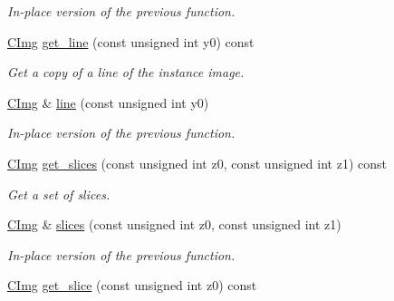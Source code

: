 \begin{DoxyCompactItemize}
\begin{DoxyCompactList}\small\item\em In-\/place version of the previous function. \end{DoxyCompactList}\item 
\hypertarget{structcimg__library_1_1_c_img_aa26c97d13f11c389f4822795e83d5ba5}{\hyperlink{structcimg__library_1_1_c_img}{C\-Img} \hyperlink{structcimg__library_1_1_c_img_aa26c97d13f11c389f4822795e83d5ba5}{get\-\_\-line} (const unsigned int y0) const }\label{structcimg__library_1_1_c_img_aa26c97d13f11c389f4822795e83d5ba5}

\begin{DoxyCompactList}\small\item\em Get a copy of a line of the instance image. \end{DoxyCompactList}\item 
\hypertarget{structcimg__library_1_1_c_img_a7f3b504730dd9cfcdf1c7b136e97b231}{\hyperlink{structcimg__library_1_1_c_img}{C\-Img} \& \hyperlink{structcimg__library_1_1_c_img_a7f3b504730dd9cfcdf1c7b136e97b231}{line} (const unsigned int y0)}\label{structcimg__library_1_1_c_img_a7f3b504730dd9cfcdf1c7b136e97b231}

\begin{DoxyCompactList}\small\item\em In-\/place version of the previous function. \end{DoxyCompactList}\item 
\hypertarget{structcimg__library_1_1_c_img_a9843f41876a24140412075a8c711bfd3}{\hyperlink{structcimg__library_1_1_c_img}{C\-Img} \hyperlink{structcimg__library_1_1_c_img_a9843f41876a24140412075a8c711bfd3}{get\-\_\-slices} (const unsigned int z0, const unsigned int z1) const }\label{structcimg__library_1_1_c_img_a9843f41876a24140412075a8c711bfd3}

\begin{DoxyCompactList}\small\item\em Get a set of slices. \end{DoxyCompactList}\item 
\hypertarget{structcimg__library_1_1_c_img_af9013da94d902423534f7fe663ec640a}{\hyperlink{structcimg__library_1_1_c_img}{C\-Img} \& \hyperlink{structcimg__library_1_1_c_img_af9013da94d902423534f7fe663ec640a}{slices} (const unsigned int z0, const unsigned int z1)}\label{structcimg__library_1_1_c_img_af9013da94d902423534f7fe663ec640a}

\begin{DoxyCompactList}\small\item\em In-\/place version of the previous function. \end{DoxyCompactList}\item 
\hypertarget{structcimg__library_1_1_c_img_a3c47502661949007400a22e30f471cf6}{\hyperlink{structcimg__library_1_1_c_img}{C\-Img} \hyperlink{structcimg__library_1_1_c_img_a3c47502661949007400a22e30f471cf6}{get\-\_\-slice} (const unsigned int z0) const }\label{structcimg__library_1_1_c_img_a3c47502661949007400a22e30f471cf6}


\end{DoxyCompactItemize}
